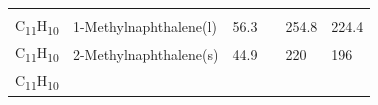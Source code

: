 \documentclass[
  9pt,
]{extbook}
\theoremstyle{definition}
\theoremstyle{definition}
\theoremstyle{definition}
\theoremstyle{remark}
\begin{document}
\begin{longtable}[]{@{}llllll@{}}
\begin{minipage}[t]{0.15\columnwidth}
\strut
\end{minipage} & \begin{minipage}[t]{0.14\columnwidth}\raggedright
\strut
\end{minipage} & \begin{minipage}[t]{0.14\columnwidth}\raggedright
\strut
\end{minipage}\tabularnewline
\begin{minipage}[t]{0.07\columnwidth}\raggedright
C\textsubscript{11}H\textsubscript{10}\strut
\end{minipage} & \begin{minipage}[t]{0.17\columnwidth}\raggedright
1-Methylnaphthalene(l)\strut
\end{minipage} & \begin{minipage}[t]{0.15\columnwidth}\raggedright
56.3\strut
\end{minipage} & \begin{minipage}[t]{0.15\columnwidth}\raggedright
\strut
\end{minipage} & \begin{minipage}[t]{0.14\columnwidth}\raggedright
254.8\strut
\end{minipage} & \begin{minipage}[t]{0.14\columnwidth}\raggedright
224.4\strut
\end{minipage}\tabularnewline
\begin{minipage}[t]{0.07\columnwidth}\raggedright
C\textsubscript{11}H\textsubscript{10}\strut
\end{minipage} & \begin{minipage}[t]{0.17\columnwidth}\raggedright
2-Methylnaphthalene(s)\strut
\end{minipage} & \begin{minipage}[t]{0.15\columnwidth}\raggedright
44.9\strut
\end{minipage} & \begin{minipage}[t]{0.15\columnwidth}\raggedright
\strut
\end{minipage} & \begin{minipage}[t]{0.14\columnwidth}\raggedright
220\strut
\end{minipage} & \begin{minipage}[t]{0.14\columnwidth}\raggedright
196\strut
\end{minipage}\tabularnewline
\begin{minipage}[t]{0.07\columnwidth}\raggedright
C\textsubscript{11}H\textsubscript{10}\strut
\end{minipage} & \begin{minipage}[t]{0.17\columnwidth}\raggedright

\end{minipage}
\end{longtable}
\end{document}
